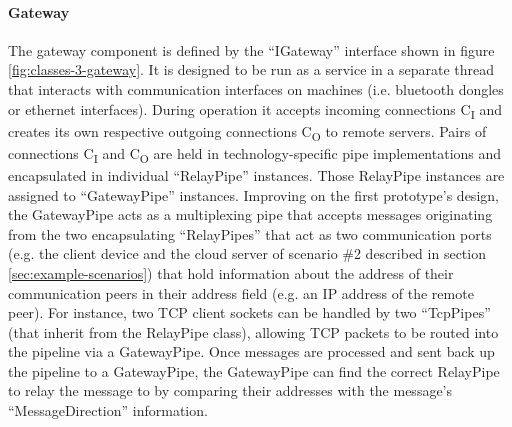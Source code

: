 \paragraph{Gateway} The gateway component is defined by the \enquote{IGateway} interface shown in figure \ref{fig:classes-3-gateway}. It is designed to be run as a service in a separate thread that interacts with communication interfaces on machines (i.e. bluetooth dongles or ethernet interfaces). During operation it accepts incoming connections C\textsubscript{I} and creates its own respective outgoing connections C\textsubscript{O} to remote servers. Pairs of connections C\textsubscript{I} and C\textsubscript{O} are held in technology-specific pipe implementations and encapsulated in individual \enquote{RelayPipe} instances. Those RelayPipe instances are assigned to \enquote{GatewayPipe} instances. Improving on the first prototype's design, the GatewayPipe acts as a multiplexing pipe that accepts messages originating from the two encapsulating \enquote{RelayPipes} that act as two communication ports (e.g. the client device and the cloud server of scenario \#2 described in section \ref{sec:example-scenarios}) that hold information about the address of their communication peers in their address field (e.g. an \ac{IP} address of the remote peer). For instance, two \ac{TCP} client sockets can be handled by two \enquote{TcpPipes} (that inherit from the RelayPipe class), allowing \ac{TCP} packets to be routed into the pipeline via a GatewayPipe. Once messages are processed and sent back up the pipeline to a GatewayPipe, the GatewayPipe can find the correct RelayPipe to relay the message to by comparing their addresses with the message's \enquote{MessageDirection} information.
